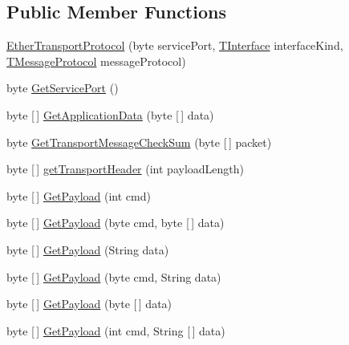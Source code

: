 \subsection*{Public Member Functions}
\begin{DoxyCompactItemize}
\item 
\mbox{\hyperlink{classcom_1_1ethernom_1_1android_1_1etherapi_1_1_ether_transport_protocol_a3827df3e5ace99c3a818a57c1bba6207}{Ether\+Transport\+Protocol}} (byte service\+Port, \mbox{\hyperlink{enumcom_1_1ethernom_1_1android_1_1etherapi_1_1link_layer_1_1_t_interface}{T\+Interface}} interface\+Kind, \mbox{\hyperlink{enumcom_1_1ethernom_1_1android_1_1etherapi_1_1_t_message_protocol}{T\+Message\+Protocol}} message\+Protocol)
\item 
byte \mbox{\hyperlink{classcom_1_1ethernom_1_1android_1_1etherapi_1_1_ether_transport_protocol_ae590c234c12d110212fd75595235a132}{Get\+Service\+Port}} ()
\item 
byte \mbox{[}$\,$\mbox{]} \mbox{\hyperlink{classcom_1_1ethernom_1_1android_1_1etherapi_1_1_ether_transport_protocol_adc5e3627f32f692dec5c6b6037fdfe3e}{Get\+Application\+Data}} (byte \mbox{[}$\,$\mbox{]} data)
\item 
byte \mbox{\hyperlink{classcom_1_1ethernom_1_1android_1_1etherapi_1_1_ether_transport_protocol_a2689adc9963e71cb1f6814c331c6ffa5}{Get\+Transport\+Message\+Check\+Sum}} (byte \mbox{[}$\,$\mbox{]} packet)
\item 
byte \mbox{[}$\,$\mbox{]} \mbox{\hyperlink{classcom_1_1ethernom_1_1android_1_1etherapi_1_1_ether_transport_protocol_ae2c4357c0d53349f62bef02091b1577a}{get\+Transport\+Header}} (int payload\+Length)
\item 
byte \mbox{[}$\,$\mbox{]} \mbox{\hyperlink{classcom_1_1ethernom_1_1android_1_1etherapi_1_1_ether_transport_protocol_aa7834cb6d0b64e72dc913a5ec1cfcfb8}{Get\+Payload}} (int cmd)
\item 
byte \mbox{[}$\,$\mbox{]} \mbox{\hyperlink{classcom_1_1ethernom_1_1android_1_1etherapi_1_1_ether_transport_protocol_ac9ecf8d82db8ea4d83bbbf4face710b0}{Get\+Payload}} (byte cmd, byte \mbox{[}$\,$\mbox{]} data)
\item 
byte \mbox{[}$\,$\mbox{]} \mbox{\hyperlink{classcom_1_1ethernom_1_1android_1_1etherapi_1_1_ether_transport_protocol_a324ab9afbb188bc0adca15d454b054ae}{Get\+Payload}} (String data)
\item 
byte \mbox{[}$\,$\mbox{]} \mbox{\hyperlink{classcom_1_1ethernom_1_1android_1_1etherapi_1_1_ether_transport_protocol_aaada66a44616b616a333c529d5bb04ad}{Get\+Payload}} (byte cmd, String data)
\item 
byte \mbox{[}$\,$\mbox{]} \mbox{\hyperlink{classcom_1_1ethernom_1_1android_1_1etherapi_1_1_ether_transport_protocol_a1220a8f0129eb2b2ae6bb84123dd67f9}{Get\+Payload}} (byte \mbox{[}$\,$\mbox{]} data)
\item 
byte \mbox{[}$\,$\mbox{]} \mbox{\hyperlink{classcom_1_1ethernom_1_1android_1_1etherapi_1_1_ether_transport_protocol_ab057f7bccb0c2bef005a657cc3eef13d}{Get\+Payload}} (int cmd, String \mbox{[}$\,$\mbox{]} data)
\end{DoxyCompactItemize}

